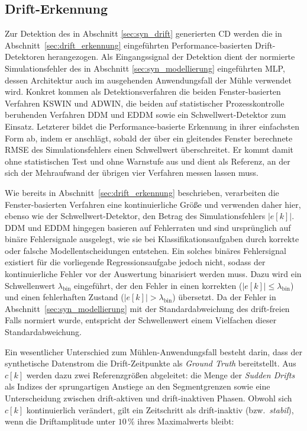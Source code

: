 \subsection{Drift-Erkennung} \label{sec:syn_detection}
%

%
Zur Detektion des in Abschnitt \ref{sec:syn_drift} generierten \ac{CD} werden die in Abschnitt~\ref{sec:drift_erkennung} eingeführten Performance-basierten Drift-Detektoren herangezogen. Als Eingangssignal der Detektion dient der normierte Simulationsfehler des in Abschnitt \ref{sec:syn_modellierung} eingeführten MLP, dessen Architektur auch im ausgehenden Anwendungsfall der Mühle verwendet wird. Konkret kommen als Detektionsverfahren die beiden Fenster-basierten Verfahren \ac{KSWIN} und \ac{ADWIN}, die beiden auf statistischer Prozesskontrolle beruhenden Verfahren \ac{DDM} und \ac{EDDM} sowie ein Schwellwert-Detektor zum Einsatz. Letzterer bildet die Performance-basierte Erkennung in ihrer einfachsten Form ab, indem er anschlägt, sobald der über ein gleitendes Fenster berechnete \ac{RMSE} des Simulationsfehlers einen Schwellwert überschreitet. Er kommt damit ohne statistischen Test und ohne Warnstufe aus und dient als Referenz, an der sich der Mehraufwand der übrigen vier Verfahren messen lassen muss. \par
%
Wie bereits in Abschnitt~\ref{sec:drift_erkennung} beschrieben, verarbeiten die Fenster-basierten Verfahren eine kontinuierliche Größe und verwenden daher hier, ebenso wie der Schwellwert-Detektor, den Betrag des Simulationsfehlers $|e[k]|$. \ac{DDM} und \ac{EDDM} hingegen basieren auf Fehlerraten und sind ursprünglich auf binäre Fehlersignale ausgelegt, wie sie bei Klassifikationsaufgaben durch korrekte oder falsche Modellentscheidungen entstehen. Ein solches binäres Fehlersignal existiert für die vorliegende Regressionsaufgabe jedoch nicht, sodass der kontinuierliche Fehler vor der Auswertung binarisiert werden muss. Dazu wird ein Schwellenwert $\lambda_{\mathrm{bin}}$ eingeführt, der den Fehler in einen korrekten ($|e[k]| \le \lambda_{\mathrm{bin}}$) und einen fehlerhaften Zustand ($|e[k]| > \lambda_{\mathrm{bin}}$) übersetzt. Da der Fehler in Abschnitt~\ref{sec:syn_modellierung} mit der Standardabweichung des drift-freien Falls normiert wurde, entspricht der Schwellenwert einem Vielfachen dieser Standardabweichung. \par
%
Ein wesentlicher Unterschied zum Mühlen-Anwendungsfall besteht darin, dass der synthetische Datenstrom die Drift-Zeitpunkte als \emph{Ground Truth} bereitstellt. Aus $c[k]$ werden dazu zwei Referenzgrößen abgeleitet: die Menge der \emph{Sudden Drifts} als Indizes der sprungartigen Anstiege an den Segmentgrenzen sowie eine Unterscheidung zwischen drift-aktiven und drift-inaktiven Phasen. Obwohl sich $c[k]$ kontinuierlich verändert, gilt ein Zeitschritt als drift-inaktiv (bzw.\ \emph{stabil}), wenn die Driftamplitude unter $10\,\%$ ihres Maximalwerts bleibt:
